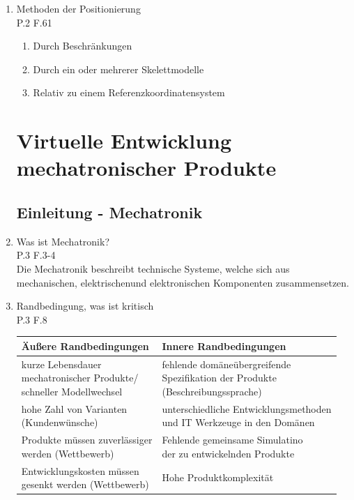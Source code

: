 \documentclass[10pt,a4paper,fleqn]{article}
\begin{document}
\begin{enumerate}
	\item Methoden der Positionierung\\
		P.2 F.61
		\begin{enumerate}
			\item Durch Beschränkungen
			\item Durch ein oder mehrerer Skelettmodelle
			\item Relativ zu einem Referenzkoordinatensystem
		\end{enumerate}
\section{Virtuelle Entwicklung mechatronischer Produkte}
\subsection{Einleitung - Mechatronik}
	\item Was ist Mechatronik?\\
		P.3 F.3-4\\
		Die Mechatronik beschreibt technische Systeme, welche sich aus mechanischen, elektrischenund elektronischen Komponenten zusammensetzen.
	\item Randbedingung, was ist kritisch\\
		P.3 F.8\\
			\begin{tabular}{|l|l|}
			\hline 
			Äußere Randbedingungen & Innere Randbedingungen \\ 
			\hline 
			\pbox{20cm}{kurze Lebensdauer \\ mechatronischer Produkte/ \\ schneller Modellwechsel} & \pbox{20cm}{fehlende domäneübergreifende \\ Spezifikation der Produkte \\ (Beschreibungssprache)} \\ 
			\hline 
			\pbox{20cm}{hohe Zahl von Varianten \\ (Kundenwünsche) } & \pbox{20cm}{unterschiedliche Entwicklungsmethoden \\ und IT Werkzeuge in den Domänen  } \\ 
			\hline 
			\pbox{20cm}{Produkte müssen zuverlässiger \\ werden (Wettbewerb) } & \pbox{20cm}{ Fehlende gemeinsame Simulatino \\ der zu entwickelnden Produkte } \\ 
			\hline 
			\pbox{20cm}{ Entwicklungskosten müssen \\ gesenkt werden (Wettbewerb) } &  Hohe Produktkomplexität \\ 

\end{tabular}
\end{enumerate}
\end{document}
